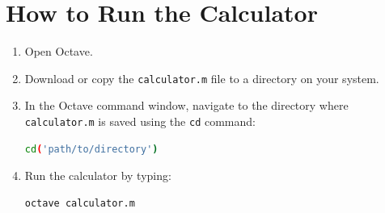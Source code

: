 \documentclass[a4paper,12pt]{article}
\begin{document}
\section*{How to Run the Calculator}

\begin{enumerate}
    \item Open Octave.
    \item Download or copy the \texttt{calculator.m} file to a directory on your system.
    \item In the Octave command window, navigate to the directory where \texttt{calculator.m} is saved using the \texttt{cd} command:
    \begin{lstlisting}[language=bash]
    cd('path/to/directory')
    \end{lstlisting}
    \item Run the calculator by typing:
    \begin{lstlisting}[language=octave]
    octave calculator.m
    \end{lstlisting}
\end{enumerate}
\end{document}
